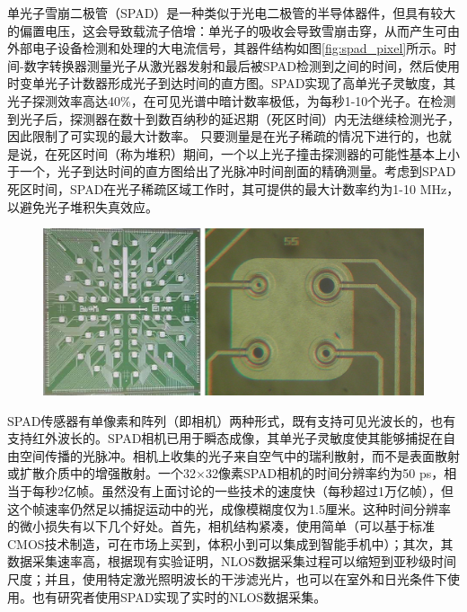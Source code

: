 \documentclass[master]{shtthesis}             %
\begin{document}
单光子雪崩二极管（SPAD）是一种类似于光电二极管的半导体器件，但具有较大的偏置电压，这会导致载流子倍增：单光子的吸收会导致雪崩击穿，从而产生可由外部电子设备检测和处理的大电流信号，其器件结构如图\ref{fig:spad_pixel}所示\citep{zappa2007principles}。时间-数字转换器测量光子从激光器发射和最后被SPAD检测到之间的时间，然后使用时变单光子计数器形成光子到达时间的直方图\citep{becker2005advanced}。SPAD实现了高单光子灵敏度，其光子探测效率高达40\%，在可见光谱中暗计数率极低，为每秒1-10个光子。在检测到光子后，探测器在数十到数百纳秒的延迟期（死区时间）内无法继续检测光子，因此限制了可实现的最大计数率。
只要测量是在光子稀疏的情况下进行的，也就是说，在死区时间（称为堆积）期间，一个以上光子撞击探测器的可能性基本上小于一个，光子到达时间的直方图给出了光脉冲时间剖面的精确测量。考虑到SPAD死区时间，SPAD在光子稀疏区域工作时，其可提供的最大计数率约为1-10 MHz，以避免光子堆积失真效应。

\begin{figure}[!tb]
  \centering
  \includegraphics[width=\textwidth]{figure/spad_array.jpg}
  \label{fig:spad_array}
\end{figure}

SPAD传感器有单像素和阵列（即相机）两种形式，既有支持可见光波长的\citep{richardson200932,richardson2011scaleable,gersbach2012time,bronzi2014100,burri2016linospad}，也有支持红外波长的\citep{itzler2008geiger,itzler2008single,itzler2007single}。SPAD相机已用于瞬态成像，其单光子灵敏度使其能够捕捉在自由空间传播的光脉冲。相机上收集的光子来自空气中的瑞利散射，而不是表面散射或扩散介质中的增强散射\citep{gariepy2015single}。一个32$\times$32像素SPAD相机的时间分辨率约为50 ps，相当于每秒2亿帧。虽然没有上面讨论的一些技术的速度快（每秒超过1万亿帧），但这个帧速率仍然足以捕捉运动中的光，成像模糊度仅为1.5厘米。这种时间分辨率的微小损失有以下几个好处。首先，相机结构紧凑，使用简单（可以基于标准CMOS技术制造，可在市场上买到，体积小到可以集成到智能手机中）；其次，其数据采集速率高，根据现有实验证明，NLOS数据采集过程可以缩短到亚秒级时间尺度\citep{musarra2019non}；并且，使用特定激光照明波长的干涉滤光片，也可以在室外和日光条件下使用\citep{Otoole2018,chan2017non}。也有研究者使用SPAD实现了实时的NLOS数据采集\citep{lindell2018towards}。
\end{document}
